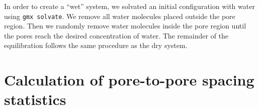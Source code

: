 \documentclass{article}
\begin{document}
  In order to create a ``wet'' system, we solvated an initial configuration with
  water using \texttt{gmx solvate}. We remove all water molecules placed outside
  the pore region. Then we randomly remove water molecules inside the pore region
  until the pores reach the desired concentration of water. The remainder of the
  equilibration follows the same procedure as the dry system. 

  \clearpage

  \section{Calculation of pore-to-pore spacing statistics}\label{section:p2p_stats}
 
\end{document}
